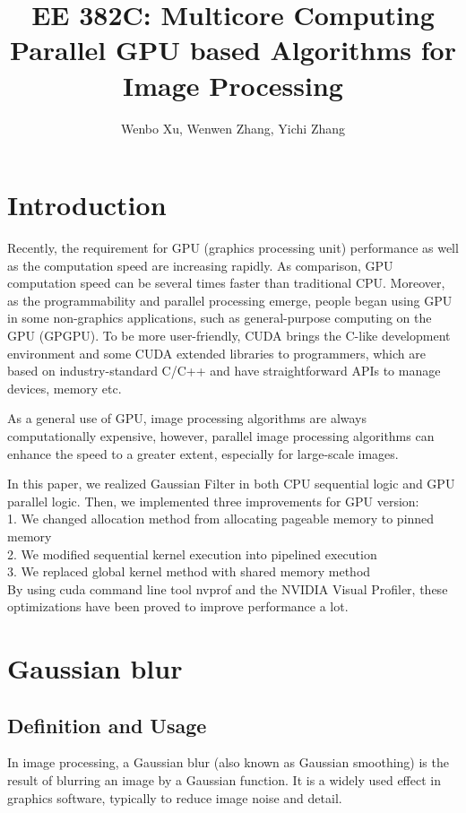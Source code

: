 \documentclass[journal,11pt,onecolumn,draftclsnofoot]{ieeeconf}  %
\author{Wenbo Xu, Wenwen Zhang, Yichi Zhang}
\title{
	EE 382C: Multicore Computing \protect\\
	\Large \bf Parallel GPU based Algorithms for Image Processing
}
\begin{document}
\maketitle
\thispagestyle{empty}
\pagestyle{empty}

\section{Introduction}
Recently, the requirement for GPU (graphics processing unit) performance as well as the computation speed are increasing rapidly. As comparison, GPU computation speed can be several times faster than traditional CPU. Moreover, as the programmability and parallel processing emerge\cite{1},  people began using GPU in some non-graphics applications, such as general-purpose computing on the GPU (GPGPU). To be more user-friendly, CUDA brings the C-like development environment and some CUDA extended libraries to programmers, which are based on industry-standard C/C++ and have straightforward APIs to manage devices, memory etc.

As a general use of GPU, image processing algorithms are always computationally expensive, however, parallel image processing algorithms can enhance the speed to a greater extent, especially for large-scale images.

In this paper, we realized Gaussian Filter in both CPU sequential logic and GPU parallel logic. Then, we implemented three improvements for GPU version:  \\
1. We changed allocation method from allocating pageable memory to pinned memory \\
2. We modified sequential kernel execution into pipelined execution \\
3. We replaced global kernel method with shared memory method \\

By using cuda command line tool nvprof and the NVIDIA Visual Profiler, these optimizations have been proved to improve performance a lot.

\section{Gaussian blur}
\subsection{Definition and Usage}
In image processing, a Gaussian blur (also known as Gaussian smoothing) is the result of blurring an image by a Gaussian function. It is a widely used effect in graphics software, typically to reduce image noise and  detail. 
\end{document}
